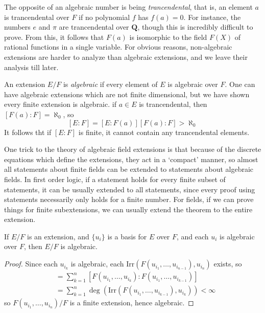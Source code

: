 \begin{remark}
	The opposite of an algebraic number is being {\it trancendental}, that is, an element $a$ is trancendental over $F$ if no polynomial $f$ has $f(a) = 0$. For instance, the numbers $e$ and $\pi$ are trancendental over $\mathbf{Q}$, though this is incredibly difficult to prove. From this, it follows that $F(a)$ is isomorphic to the field $F(X)$ of rational functions in a single variable. For obvious reasons, non-algebraic extensions are harder to analyze than algebraic extensions, and we leave their analysis till later.
\end{remark}

An extension $E/F$ is {\it algebraic} if every element of $E$ is algebraic over $F$. One can have algebraic extensions which are not finite dimensional, but we have shown every finite extension is algebraic. if $a \in E$ is trancendental, then $[F(a): F] = \aleph_0$, so
%
\[ [E:F] = [E:F(a)][F(a):F] > \aleph_0 \]
%
It follows tht if $[E:F]$ is finite, it cannot contain any trancendental elements.

One trick to the theory of algebraic field extensions is that because of the discrete equations which define the extensions, they act in a `compact' manner, so almost all statements about finite fields can be extended to statements about algebraic fields. In first order logic, if a statement holds for every finite subset of statements, it can be usually extended to all statements, since every proof using statements necessarily only holds for a finite number. For fields, if we can prove things for finite subextensions, we can usually extend the theorem to the entire extension.

\begin{theorem}
    If $E/F$ is an extension, and $\{ u_i \}$ is a basis for $E$ over $F$, and each $u_i$ is algebraic over $F$, then $E/F$ is algebraic.
\end{theorem}
\begin{proof}
	Since each $u_{i_k}$ is algebraic, each $\text{Irr}(F(u_{i_1}, \dots, u_{i_{n-1}}), u_{i_n})$ exists, so
    \begin{align*}
        [F(u_{i_1}, \dots, u_{i_n}): F] &= \sum_{k = 1}^n \left[F(u_{i_1}, \dots, u_{i_k}): F(u_{i_1}, \dots, u_{i_{k-1}})\right]\\
        &= \sum_{k = 1}^n \deg\left(\text{Irr}\left(F(u_{i_1}, \dots, u_{i_{k-1}}), u_{i_k} \right) \right) < \infty
    \end{align*}
    so $F(u_{i_1}, \dots, u_{i_n})/F$ is a finite extension, hence algebraic.
\end{proof}

